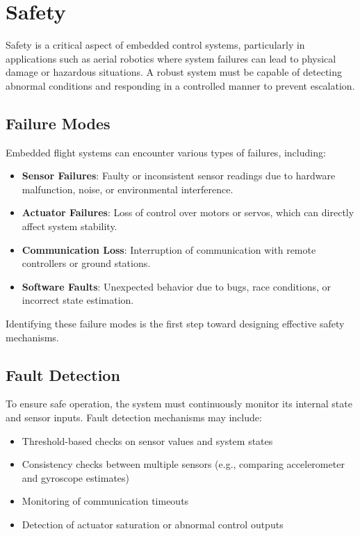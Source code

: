 \section{Safety}
\label{sec:safety}

Safety is a critical aspect of embedded control systems, particularly in applications such as aerial robotics where system failures can lead to physical damage or hazardous situations. A robust system must be capable of detecting abnormal conditions and responding in a controlled manner to prevent escalation.

\subsection{Failure Modes}

Embedded flight systems can encounter various types of failures, including:

\begin{itemize}
    \item \textbf{Sensor Failures}:  
    Faulty or inconsistent sensor readings due to hardware malfunction, noise, or environmental interference.

    \item \textbf{Actuator Failures}:  
    Loss of control over motors or servos, which can directly affect system stability.

    \item \textbf{Communication Loss}:  
    Interruption of communication with remote controllers or ground stations.

    \item \textbf{Software Faults}:  
    Unexpected behavior due to bugs, race conditions, or incorrect state estimation.
\end{itemize}

Identifying these failure modes is the first step toward designing effective safety mechanisms.

\subsection{Fault Detection}

To ensure safe operation, the system must continuously monitor its internal state and sensor inputs. Fault detection mechanisms may include:

\begin{itemize}
    \item Threshold-based checks on sensor values and system states
    \item Consistency checks between multiple sensors (e.g., comparing accelerometer and gyroscope estimates)
    \item Monitoring of communication timeouts
    \item Detection of actuator saturation or abnormal control outputs
\end{itemize}

